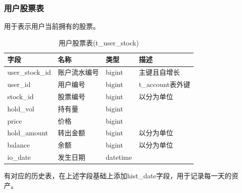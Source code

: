 \documentclass{article}
\begin{document}
\subsubsection{用户股票表}
用于表示用户当前拥有的股票。
\begin{table}[H]
    \caption{用户股票表(t\_user\_stock)}
    \label{t000005}
    \begin{tabular}{|p{2cm}|p{3cm}|p{2cm}|p{5cm}|} \hline
        字段 & 名称 & 类型 & 描述 \\ \hline 
        user\_stock\_id & 账户流水编号 & bigint & 主键且自增长 \\ \hline
        user\_id & 用户编号 & bigint & t\_account表外键 \\ \hline
        stock\_id & 股票编号 & bigint & 以分为单位 \\ \hline
        hold\_vol & 持有量 & bigint & \\ \hline
        price & 价格 & bigint & \\ \hline
        hold\_amount & 转出金额 & bigint & 以分为单位 \\ \hline
        balance & 余额 & bigint & 以分为单位  \\ \hline
        io\_date & 发生日期 & datetime & \\ \hline
    \end{tabular}
\end{table}
有对应的历史表，在上述字段基础上添加hist\_date字段，用于记录每一天的资产。
\end{document}
